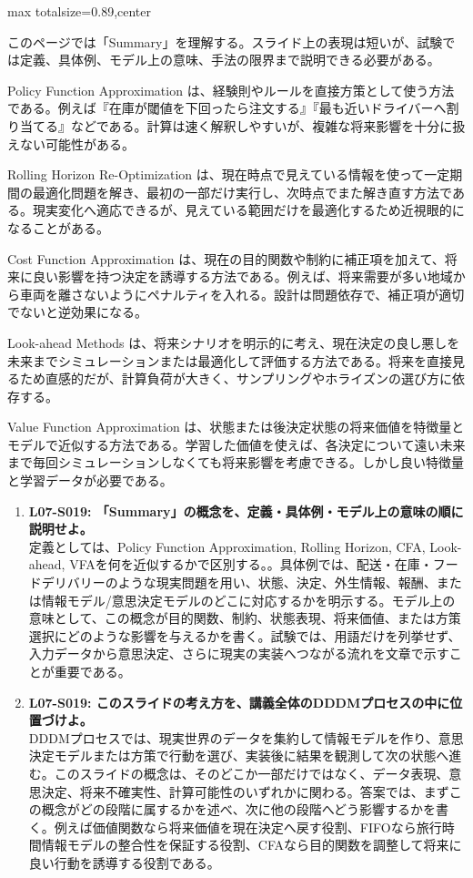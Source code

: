 \begin{minipage}[t]{0.58\textwidth}
\begin{adjustbox}{max totalsize={\textwidth}{0.89\textheight},center}
\begin{minipage}{\textwidth}\scriptsize
{}このページでは「Summary」を理解する。スライド上の表現は短いが、試験では定義、具体例、モデル上の意味、手法の限界まで説明できる必要がある。\par
Policy Function Approximation は、経験則やルールを直接方策として使う方法である。例えば『在庫が閾値を下回ったら注文する』『最も近いドライバーへ割り当てる』などである。計算は速く解釈しやすいが、複雑な将来影響を十分に扱えない可能性がある。\par
Rolling Horizon Re-Optimization は、現在時点で見えている情報を使って一定期間の最適化問題を解き、最初の一部だけ実行し、次時点でまた解き直す方法である。現実変化へ適応できるが、見えている範囲だけを最適化するため近視眼的になることがある。\par
Cost Function Approximation は、現在の目的関数や制約に補正項を加えて、将来に良い影響を持つ決定を誘導する方法である。例えば、将来需要が多い地域から車両を離さないようにペナルティを入れる。設計は問題依存で、補正項が適切でないと逆効果になる。\par
Look-ahead Methods は、将来シナリオを明示的に考え、現在決定の良し悪しを未来までシミュレーションまたは最適化して評価する方法である。将来を直接見るため直感的だが、計算負荷が大きく、サンプリングやホライズンの選び方に依存する。\par
Value Function Approximation は、状態または後決定状態の将来価値を特徴量とモデルで近似する方法である。学習した価値を使えば、各決定について遠い未来まで毎回シミュレーションしなくても将来影響を考慮できる。しかし良い特徴量と学習データが必要である。\par{}\begin{enumerate}\item \textbf{L07-S019: 「Summary」の概念を、定義・具体例・モデル上の意味の順に説明せよ。}\\定義としては、Policy Function Approximation, Rolling Horizon, CFA, Look-ahead, VFAを何を近似するかで区別する。。具体例では、配送・在庫・フードデリバリーのような現実問題を用い、状態、決定、外生情報、報酬、または情報モデル/意思決定モデルのどこに対応するかを明示する。モデル上の意味として、この概念が目的関数、制約、状態表現、将来価値、または方策選択にどのような影響を与えるかを書く。試験では、用語だけを列挙せず、入力データから意思決定、さらに現実の実装へつながる流れを文章で示すことが重要である。\item \textbf{L07-S019: このスライドの考え方を、講義全体のDDDMプロセスの中に位置づけよ。}\\DDDMプロセスでは、現実世界のデータを集約して情報モデルを作り、意思決定モデルまたは方策で行動を選び、実装後に結果を観測して次の状態へ進む。このスライドの概念は、そのどこか一部だけではなく、データ表現、意思決定、将来不確実性、計算可能性のいずれかに関わる。答案では、まずこの概念がどの段階に属するかを述べ、次に他の段階へどう影響するかを書く。例えば価値関数なら将来価値を現在決定へ戻す役割、FIFOなら旅行時間情報モデルの整合性を保証する役割、CFAなら目的関数を調整して将来に良い行動を誘導する役割である。\end{enumerate}

\end{minipage}
\end{adjustbox}
\end{minipage}
